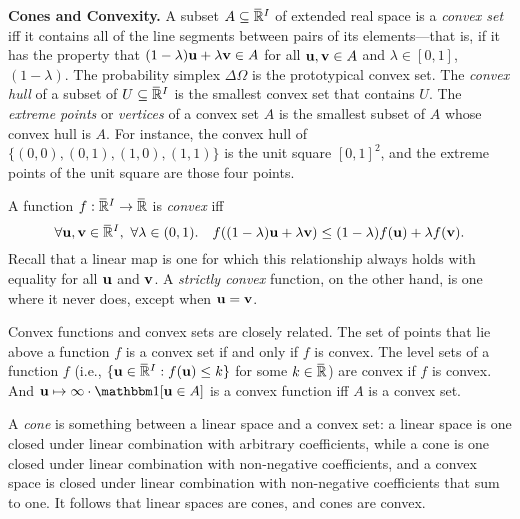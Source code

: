 \textbf{Cones and Convexity.}
A subset $A \subseteq \mskip1mu\overline{\mskip-1mu\mathbb R\!}\,^I$ of extended real space is a \emph{convex set} iff
it contains all of the line segments between pairs of its elements---that is, if
it has the property that
$
(1-\lambda) \mathbf u + \lambda \mathbf v \in A
$
for all $\mathbf u, \mathbf v \in A$ and $\lambda \in [0,1]$,
$(1-\lambda)$.
The probability simplex $\Delta \Omega$ is the prototypical convex set. 
The \emph{convex hull} of a subset of $U \subseteq \mskip1mu\overline{\mskip-1mu\mathbb R\!}\,^I$ is the smallest convex set that contains $U$. 
The \emph{extreme points} or \emph{vertices} of a convex set $A$ is the smallest subset 
of $A$ whose convex hull is $A$. 
For instance, the convex hull of $\{ (0,0), (0,1), (1,0), (1,1) \}$
is the unit square $[0,1]^2$, and the extreme points of the unit square are those four points. 

%
A function $f : \mskip1mu\overline{\mskip-1mu\mathbb R\!}\,^I \to \mskip1mu\overline{\mskip-1mu\mathbb R\!}\,$ is \emph{convex} iff
\[
    \forall \mathbf u, \mathbf v \in \mskip1mu\overline{\mskip-1mu\mathbb R\!}\,^I,~\forall \lambda \in (0,1).\quad
    f( (1-\lambda) \mathbf u + \lambda \mathbf v ) \le (1-\lambda) f(\mathbf u) + \lambda f(\mathbf v).
\]
Recall that a linear map is one for which this relationship always holds with equality for all $\mathbf u$ and $\mathbf v$. 
A \emph{strictly convex} function, on the other hand, is one where it never does, except when $\mathbf u = \mathbf v$. 

Convex functions and convex sets are closely related. The set of points that lie above a function $f$
is a convex set if and only if $f$ is convex. The level sets of a function $f$ (i.e., $\{ \mathbf u \in \mskip1mu\overline{\mskip-1mu\mathbb R\!}\,^I : f(\mathbf u) \le k \}$ for some $k \in \mskip1mu\overline{\mskip-1mu\mathbb R\!}\,$) are convex if $f$ is convex. 
And $\mat u \mapsto \infty \cdot \mathbbm 1[\mat u \in A]$ is a convex function iff $A$ is a convex set. 

A \emph{cone} is something between a linear space and a convex set: a linear space is one closed under linear combination with arbitrary coefficients, while a cone is one closed under linear combination with non-negative coefficients, and a convex space is closed under linear combination with non-negative coefficients that sum to one.
It follows that linear spaces are cones, and cones are convex.


